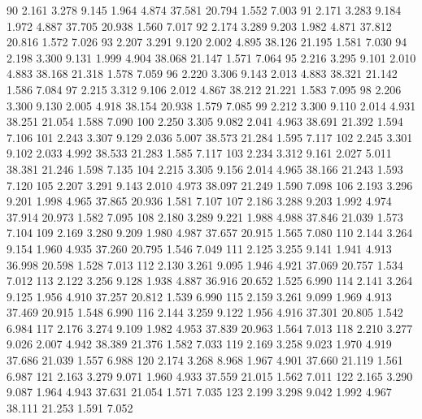 \documentclass[a4paper,11pt]{scrartcl}
\begin{document}
\begin{Schunk}
\begin{Soutput}
90   2.161  3.278    9.145     1.964  4.874   37.581   20.794    1.552  7.003
91   2.171  3.283    9.184     1.972  4.887   37.705   20.938    1.560  7.017
92   2.174  3.289    9.203     1.982  4.871   37.812   20.816    1.572  7.026
93   2.207  3.291    9.120     2.002  4.895   38.126   21.195    1.581  7.030
94   2.198  3.300    9.131     1.999  4.904   38.068   21.147    1.571  7.064
95   2.216  3.295    9.101     2.010  4.883   38.168   21.318    1.578  7.059
96   2.220  3.306    9.143     2.013  4.883   38.321   21.142    1.586  7.084
97   2.215  3.312    9.106     2.012  4.867   38.212   21.221    1.583  7.095
98   2.206  3.300    9.130     2.005  4.918   38.154   20.938    1.579  7.085
99   2.212  3.300    9.110     2.014  4.931   38.251   21.054    1.588  7.090
100  2.250  3.305    9.082     2.041  4.963   38.691   21.392    1.594  7.106
101  2.243  3.307    9.129     2.036  5.007   38.573   21.284    1.595  7.117
102  2.245  3.301    9.102     2.033  4.992   38.533   21.283    1.585  7.117
103  2.234  3.312    9.161     2.027  5.011   38.381   21.246    1.598  7.135
104  2.215  3.305    9.156     2.014  4.965   38.166   21.243    1.593  7.120
105  2.207  3.291    9.143     2.010  4.973   38.097   21.249    1.590  7.098
106  2.193  3.296    9.201     1.998  4.965   37.865   20.936    1.581  7.107
107  2.186  3.288    9.203     1.992  4.974   37.914   20.973    1.582  7.095
108  2.180  3.289    9.221     1.988  4.988   37.846   21.039    1.573  7.104
109  2.169  3.280    9.209     1.980  4.987   37.657   20.915    1.565  7.080
110  2.144  3.264    9.154     1.960  4.935   37.260   20.795    1.546  7.049
111  2.125  3.255    9.141     1.941  4.913   36.998   20.598    1.528  7.013
112  2.130  3.261    9.095     1.946  4.921   37.069   20.757    1.534  7.012
113  2.122  3.256    9.128     1.938  4.887   36.916   20.652    1.525  6.990
114  2.141  3.264    9.125     1.956  4.910   37.257   20.812    1.539  6.990
115  2.159  3.261    9.099     1.969  4.913   37.469   20.915    1.548  6.990
116  2.144  3.259    9.122     1.956  4.916   37.301   20.805    1.542  6.984
117  2.176  3.274    9.109     1.982  4.953   37.839   20.963    1.564  7.013
118  2.210  3.277    9.026     2.007  4.942   38.389   21.376    1.582  7.033
119  2.169  3.258    9.023     1.970  4.919   37.686   21.039    1.557  6.988
120  2.174  3.268    8.968     1.967  4.901   37.660   21.119    1.561  6.987
121  2.163  3.279    9.071     1.960  4.933   37.559   21.015    1.562  7.011
122  2.165  3.290    9.087     1.964  4.943   37.631   21.054    1.571  7.035
123  2.199  3.298    9.042     1.992  4.967   38.111   21.253    1.591  7.052

\end{Soutput}
\end{Schunk}
\end{document}
